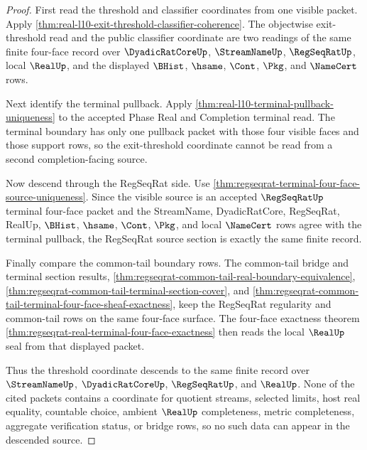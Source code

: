 \begin{proof}
First read the threshold and classifier coordinates from one visible packet. Apply \autoref{thm:real-l10-exit-threshold-classifier-coherence}. The objectwise exit-threshold read and the public classifier coordinate are two readings of the same finite four-face record over $\DyadicRatCoreUp$, $\StreamNameUp$, $\RegSeqRatUp$, local $\RealUp$, and the displayed $\BHist$, $\hsame$, $\Cont$, $\Pkg$, and $\NameCert$ rows.

Next identify the terminal pullback. Apply \autoref{thm:real-l10-terminal-pullback-uniqueness} to the accepted Phase Real and Completion terminal read. The terminal boundary has only one pullback packet with those four visible faces and those support rows, so the exit-threshold coordinate cannot be read from a second completion-facing source.

Now descend through the RegSeqRat side. Use \autoref{thm:regseqrat-terminal-four-face-source-uniqueness}. Since the visible source is an accepted $\RegSeqRatUp$ terminal four-face packet and the StreamName, DyadicRatCore, RegSeqRat, RealUp, $\BHist$, $\hsame$, $\Cont$, $\Pkg$, and local $\NameCert$ rows agree with the terminal pullback, the RegSeqRat source section is exactly the same finite record.

Finally compare the common-tail boundary rows. The common-tail bridge and terminal section results, \autoref{thm:regseqrat-common-tail-real-boundary-equivalence}, \autoref{thm:regseqrat-common-tail-terminal-section-cover}, and \autoref{thm:regseqrat-common-tail-terminal-four-face-sheaf-exactness}, keep the RegSeqRat regularity and common-tail rows on the same four-face surface. The four-face exactness theorem \autoref{thm:regseqrat-real-terminal-four-face-exactness} then reads the local $\RealUp$ seal from that displayed packet.

Thus the threshold coordinate descends to the same finite record over $\StreamNameUp$, $\DyadicRatCoreUp$, $\RegSeqRatUp$, and $\RealUp$. None of the cited packets contains a coordinate for quotient streams, selected limits, host real equality, countable choice, ambient $\RealUp$ completeness, metric completeness, aggregate verification status, or bridge rows, so no such data can appear in the descended source.
\end{proof}

